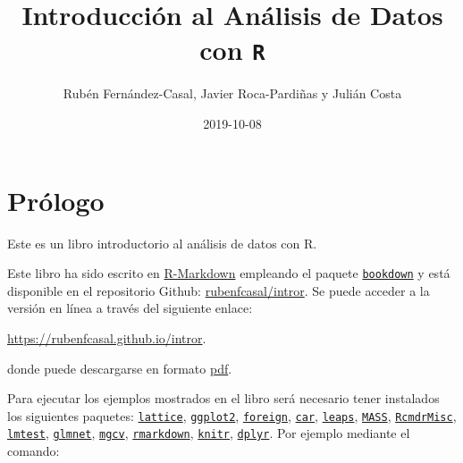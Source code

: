 \documentclass[]{book}
\title{Introducción al Análisis de Datos con \texttt{R}}
\author{Rubén Fernández-Casal, Javier Roca-Pardiñas y Julián Costa}
\date{2019-10-08}
\begin{document}
\maketitle

{
\setcounter{tocdepth}{1}
\tableofcontents
}
\chapter*{Prólogo}\label{prologo}

Este es un libro introductorio al análisis de datos con R.

Este libro ha sido escrito en
\href{http://rmarkdown.rstudio.com}{R-Markdown} empleando el paquete
\href{https://bookdown.org/yihui/bookdown/}{\texttt{bookdown}} y está
disponible en el repositorio Github:
\href{https://github.com/rubenfcasal/book_remuestreo}{rubenfcasal/intror}.
Se puede acceder a la versión en línea a través del siguiente enlace:

\url{https://rubenfcasal.github.io/intror}.

donde puede descargarse en formato
\href{https://rubenfcasal.github.io/intror/Intro_Analisis_Datos_R.pdf}{pdf}.

Para ejecutar los ejemplos mostrados en el libro será necesario tener
instalados los siguientes paquetes:
\href{https://cran.r-project.org/web/packages/lattice/index.html}{\texttt{lattice}},
\href{https://cran.r-project.org/web/packages/ggplot2/index.html}{\texttt{ggplot2}},
\href{https://cran.r-project.org/web/packages/foreign/index.html}{\texttt{foreign}},
\href{https://cran.r-project.org/web/packages/car/index.html}{\texttt{car}},
\href{https://cran.r-project.org/web/packages/leaps/index.html}{\texttt{leaps}},
\href{https://cran.r-project.org/web/packages/MASS/index.html}{\texttt{MASS}},
\href{https://cran.r-project.org/web/packages/RcmdrMisc/index.html}{\texttt{RcmdrMisc}},
\href{https://cran.r-project.org/web/packages/lmtest/index.html}{\texttt{lmtest}},
\href{https://cran.r-project.org/web/packages/glmnet/index.html}{\texttt{glmnet}},
\href{https://cran.r-project.org/web/packages/mgcv/index.html}{\texttt{mgcv}},
\href{https://cran.r-project.org/web/packages/rmarkdown/index.html}{\texttt{rmarkdown}},
\href{https://cran.r-project.org/web/packages/knitr/index.html}{\texttt{knitr}},
\href{https://cran.r-project.org/web/packages/dplyr/index.html}{\texttt{dplyr}}.
Por ejemplo mediante el comando:
\end{document}
